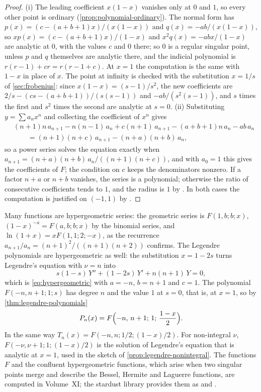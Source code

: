 \begin{proof}
(i) The leading coefficient $x(1-x)$ vanishes only at $0$ and $1$, so every other point is ordinary (\cref{prop:polynomial-ordinary}). The normal form has $p(x)=(c-(a+b+1)x)/(x(1-x))$ and $q(x)=-ab/(x(1-x))$, so $xp(x)=(c-(a+b+1)x)/(1-x)$ and $x^2q(x)=-abx/(1-x)$ are analytic at $0$, with the values $c$ and $0$ there; so $0$ is a regular singular point, unless $p$ and $q$ themselves are analytic there, and the indicial polynomial is $r(r-1)+cr=r(r-1+c)$. At $x=1$ the computation is the same with $1-x$ in place of $x$. The point at infinity is checked with the substitution $x=1/s$ of \cref{sec:frobenius}: since $x(1-x)=(s-1)/s^2$, the new coefficients are $2/s-(cs-(a+b+1))/(s(s-1))$ and $-ab/(s^2(s-1))$, and $s$ times the first and $s^2$ times the second are analytic at $s=0$. (ii) Substituting $y=\sum a_nx^n$ and collecting the coefficient of $x^n$ gives
\begin{align*}
&(n+1)n\,a_{n+1}-n(n-1)\,a_n+c(n+1)\,a_{n+1}-(a+b+1)n\,a_n-ab\,a_n\\
&\qquad=(n+1)(n+c)\,a_{n+1}-(n+a)(n+b)\,a_n ,
\end{align*}
so a power series solves the equation exactly when $a_{n+1}=(n+a)(n+b)\,a_n/((n+1)(n+c))$, and with $a_0=1$ this gives the coefficients of $F$; the condition on $c$ keeps the denominators nonzero. If a factor $n+a$ or $n+b$ vanishes, the series is a polynomial; otherwise the ratio of consecutive coefficients tends to $1$, and the radius is $1$ by . In both cases the computation is justified on $(-1,1)$ by .
\end{proof}

Many functions are hypergeometric series: the geometric series is $F(1,b;b;x)$, $(1-x)^{-a}=F(a,b;b;x)$ by the binomial series, and $\ln(1+x)=xF(1,1;2;-x)$, as the recurrence $a_{n+1}/a_n=(n+1)^2/((n+1)(n+2))$ confirms. The Legendre polynomials are hypergeometric as well: the substitution $x=1-2s$ turns Legendre's equation with $\nu=n$ into
\[
s(1-s)\,Y''+(1-2s)\,Y'+n(n+1)\,Y=0 ,
\]
which is \eqref{eq:hypergeometric} with $a=-n$, $b=n+1$ and $c=1$. The polynomial $F(-n,n+1;1;s)$ has degree $n$ and the value $1$ at $s=0$, that is, at $x=1$, so by \cref{thm:legendre-polynomials}
\[
P_n(x)=F\Bigl(-n,\,n+1;\,1;\,\frac{1-x}2\Bigr) .
\]
In the same way $T_n(x)=F(-n,n;1/2;(1-x)/2)$. For non-integral $\nu$, $F(-\nu,\nu+1;1;(1-x)/2)$ is the solution of Legendre's equation that is analytic at $x=1$, used in the sketch of \cref{prop:legendre-nonintegral}. The functions $F$ and the confluent hypergeometric functions, which arise when two singular points merge and describe the Bessel, Hermite and Laguerre functions, are computed in Volume~XI; the stardust library provides them as  and .

